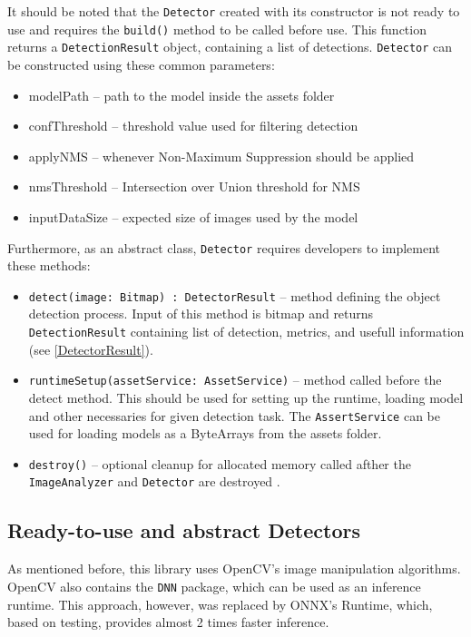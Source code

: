 It should be noted that the \texttt{Detector} created with its constructor is not ready to use and requires the \texttt{build()} method to be called before use. This function returns a \texttt{DetectionResult} object, containing a list of detections. \texttt{Detector} can be constructed using these common parameters:

\bigskip
\begin{itemize}
  \item {modelPath -- path to the model inside the assets folder}
  \item {confThreshold -- threshold value used for filtering detection}
  \item {applyNMS -- whenever Non-Maximum Suppression should be applied}
  \item {nmsThreshold -- Intersection over Union threshold for NMS}
  \item {inputDataSize -- expected size of images used by the model}
\end{itemize}
\bigskip

Furthermore, as an abstract class, \texttt{Detector} requires developers to implement these methods:

\bigskip
\begin{itemize}
  \item {\texttt{detect(image: Bitmap) : DetectorResult} -- method defining the object detection process. Input of this method is bitmap and returns \texttt{DetectionResult} containing list of detection, metrics, and usefull information (see \ref{DetectorResult}).}
  \item {\texttt{runtimeSetup(assetService: AssetService)} -- method called before the detect method. This should be used for setting up the runtime, loading model and other necessaries for given detection task. The \texttt{AssertService} can be used for loading models as a ByteArrays from the assets folder.}
  \item {\texttt{destroy()} -- optional cleanup for allocated memory called afther the \texttt{ImageAnalyzer} and \texttt{Detector} are destroyed .}
\end{itemize}
\bigskip

\subsection{Ready-to-use and abstract Detectors}
As mentioned before, this library uses OpenCV's image manipulation algorithms. OpenCV also contains the \texttt{DNN} package, which can be used as an inference runtime. This approach, however, was replaced by ONNX's Runtime, which, based on testing, provides almost 2 times faster inference. 


